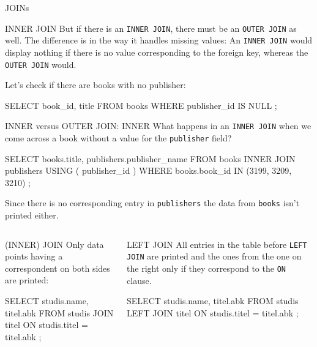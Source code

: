 \begin{frame}{JOINs}
\begin{block}{INNER JOIN}
But if there is an \texttt{INNER JOIN}, there must be an \texttt{OUTER JOIN} as well.
The difference is in the way it handles missing values: An \texttt{INNER JOIN} would display nothing if there is no value corresponding to the foreign key, whereas the \texttt{OUTER JOIN} would.

Let's check if there are books with no publisher:
\begin{sqlcode}
SELECT book_id, title FROM books WHERE publisher_id IS NULL ;
\end{sqlcode}
\end{block}

\framebreak 

\begin{block}{INNER versus OUTER JOIN: INNER}\footnotesize
What happens in an \texttt{INNER JOIN} when we come across a book without a value for the \texttt{publisher} field?

\begin{sqlcode}
SELECT books.title, publishers.publisher_name
FROM books
INNER JOIN publishers USING ( publisher_id )
WHERE books.book_id IN (3199, 3209, 3210) ;
\end{sqlcode}

Since there is no corresponding entry in \texttt{publishers} the data from \texttt{books} isn't printed either.
\end{block}

\framebreak 



\begin{columns}
\begin{block}{(INNER) JOIN}\small
Only data points having a correspondent on both sides are printed: 

\begin{sqlcode}
SELECT studis.name, titel.abk 
FROM studis 
JOIN titel 
ON studis.titel = titel.abk ;
\end{sqlcode}
\end{block}

\begin{block}{LEFT JOIN}\small
All entries in the table before \texttt{LEFT JOIN} are printed and the ones from the one on the right only if they correspond to the \texttt{ON} clause.

\begin{sqlcode}
SELECT studis.name, titel.abk 
FROM studis 
LEFT JOIN titel 
ON studis.titel = titel.abk ;
\end{sqlcode}
\end{block}
\end{columns}



\end{frame}
